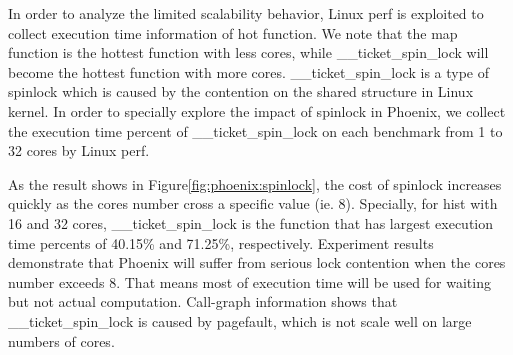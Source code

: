 In order to analyze the limited scalability behavior, Linux perf is exploited to collect execution time information of hot function. 
We note that the map function is the hottest function with less cores, while \_\_ticket\_spin\_lock will become the hottest function with more cores.
\_\_ticket\_spin\_lock is a type of spinlock which is caused by the contention on the shared structure in Linux kernel.
In order to specially explore the impact of spinlock in Phoenix, we collect the execution time percent of \_\_ticket\_spin\_lock on each benchmark from 1 to 32 cores by Linux perf.

As the result shows in Figure\ref{fig:phoenix:spinlock}, the cost of spinlock increases quickly as the cores number cross a specific value (ie. 8).
Specially, for hist with 16 and 32 cores, \_\_ticket\_spin\_lock is the function that has largest execution time percents of 40.15\%  and 71.25\%, respectively. 
Experiment results demonstrate that Phoenix will suffer from serious lock contention when the cores number exceeds 8. 
That means most of execution time will be used for waiting but not actual computation.
Call-graph information shows that \_\_ticket\_spin\_lock is caused by pagefault, which is not scale well on large numbers of cores.

